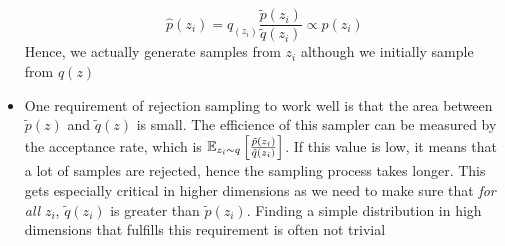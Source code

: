 \begin{itemize}
	$$\hat{p}(z_i) = q_(z_i)\frac{\tilde{p}(z_i)}{\tilde{q}(z_i)} \propto p(z_i)$$
	Hence, we actually generate samples from $z_i$ although we initially sample from $q(z)$
	\item One requirement of rejection sampling to work well is that the area between $\tilde{p}(z)$ and $\tilde{q}(z)$ is small. The efficience of this sampler can be measured by the acceptance rate, which is $\mathbb{E}_{z_i\sim q}\left[\frac{\tilde{p}(z_i)}{\tilde{q}(z_i)} \right]$. If this value is low, it means that a lot of samples are rejected, hence the sampling process takes longer. This gets especially critical in higher dimensions as we need to make sure that \textit{for all} $z_i$, $\tilde{q}(z_i)$ is greater than $\tilde{p}(z_i)$. Finding a simple distribution in high dimensions that fulfills this requirement is often not trivial
\end{itemize}
